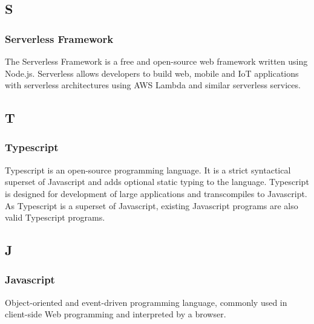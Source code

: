 	\subsection{S}
		\subsubsection*{Serverless Framework}
			The Serverless Framework is a free and open-source web framework written using Node.js. Serverless allows developers to build web, mobile and IoT applications with serverless architectures using AWS Lambda and similar serverless services.
	
	
	\subsection{T}
		\subsubsection*{Typescript}
			Typescript is an open-source programming language. It is a strict syntactical superset of Javascript and adds optional static typing to the language. Typescript is designed for development of large applications and transcompiles to Javascript. As Typescript is a superset of Javascript, existing Javascript programs are also valid Typescript programs.
			
	
	\subsection{J}
		\subsubsection*{Javascript}
			Object-oriented and event-driven programming language, commonly used in client-side Web programming and interpreted by a browser.